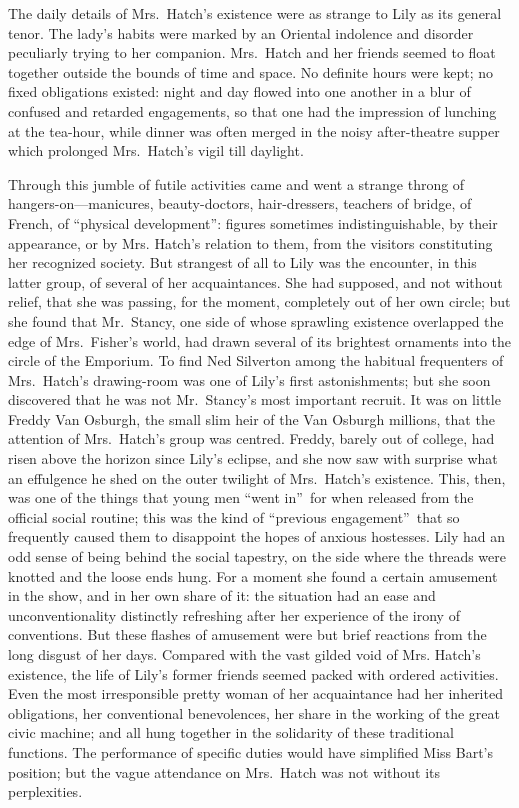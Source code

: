 \documentclass[12pt,a4paper]{book}
\begin{document}
The daily details of Mrs.\ Hatch's existence were as strange to
Lily as its general tenor. The lady's habits were marked by an
Oriental indolence and disorder peculiarly trying to her
companion. Mrs.\ Hatch and her friends seemed to float together
outside the bounds of time and space. No definite hours were
kept; no fixed obligations existed: night and day flowed into one
another in a blur of confused and retarded engagements, so that
one had the impression of lunching at the tea-hour, while dinner
was often merged in the noisy after-theatre supper which
prolonged Mrs.\ Hatch's vigil till daylight.





Through this jumble of futile activities came and went a strange
throng of hangers-on---manicures, beauty-doctors, hair-dressers,
teachers of bridge, of French, of ``physical development'': figures
sometimes indistinguishable, by their appearance, or by Mrs.
Hatch's relation to them, from the visitors constituting her
recognized society. But strangest of all to Lily was the
encounter, in this latter group, of several of her acquaintances. 
She had supposed, and not without relief, that she was passing,
for the moment, completely out of her own circle; but she found
that Mr.\ Stancy, one side of whose sprawling existence overlapped
the edge of Mrs.\ Fisher's world, had drawn several of its
brightest ornaments into the circle of the Emporium. To find Ned
Silverton among the habitual frequenters of Mrs.\ Hatch's
drawing-room was one of Lily's first astonishments; but she soon
discovered that he was not Mr.\ Stancy's most important
recruit. It was on little Freddy Van Osburgh, the small slim heir
of the Van Osburgh millions, that the attention of Mrs.\ Hatch's
group was centred. Freddy, barely out of college, had risen above
the horizon since Lily's eclipse, and she now saw with surprise
what an effulgence he shed on the outer twilight of Mrs.\ Hatch's
existence. This, then, was one of the things that young men ``went
in''\ for when released from the official social routine; this
was the kind of ``previous engagement''\ that so frequently caused
them to disappoint the hopes of anxious hostesses. Lily had an
odd sense of being behind the social tapestry, on the side where
the threads were knotted and the loose ends hung. For a moment
she found a certain amusement in the show, and in her own share
of it: the situation had an ease and unconventionality distinctly
refreshing after her experience of the irony of conventions. But
these flashes of amusement were but brief reactions from the long
disgust of her days. Compared with the vast gilded void of Mrs.
Hatch's existence, the life of Lily's former friends seemed
packed with ordered activities. Even the most irresponsible
pretty woman of her acquaintance had her inherited obligations,
her conventional benevolences, her share in the working of the
great civic machine; and all hung together in the solidarity of
these traditional functions. The performance of specific duties
would have simplified Miss Bart's position; but the vague
attendance on Mrs.\ Hatch was not without its perplexities.
\end{document}
